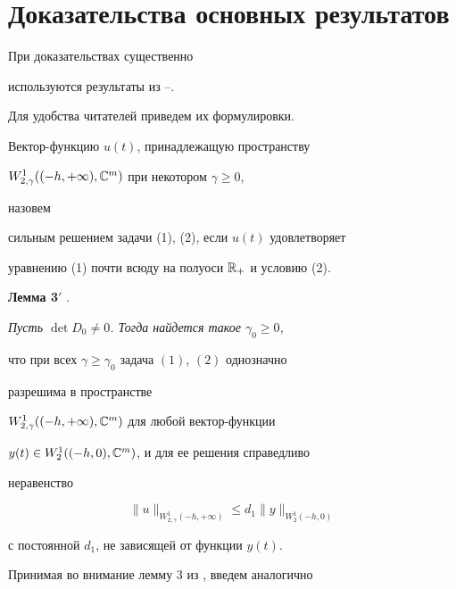  


\section{Доказательства основных результатов} 


 


При доказательствах существенно 


используются результаты из \cite{11}--\cite{16}.


Для удобства читателей приведем их формулировки.


 


\begin{defn} 


Вектор-функцию $u(t)$, принадлежащую пространству 


$W^1_{2,\gamma}((-h,+\infty),\Bbb C^m)$ при некотором $\gamma\ge0$, 


назовем 


сильным решением задачи (1), (2), если $u(t)$ удовлетворяет 


уравнению (1) почти всюду на полуоси $\Bbb R_+$ и условию (2). 


\end{defn} 





{\bf Лемма 3$'$} \cite{11}. {\it Пусть $\det 


D_0\ne0$. Тогда найдется такое $\gamma_0\ge0$, 


что при всех $\gamma\ge\gamma_0$ задача $(1)$, $(2)$ однозначно 


разрешима в пространстве 


$W^1_{2,\gamma}((-h,+\infty),\Bbb C^m)$ для любой вектор-функции 


$y(t)\in W^1_2((-h,0),\Bbb C^m)$, и для ее решения справедливо 


неравенство 


$$ 


\|u\|_{W^1_{2,\gamma}(-h,+\infty)}\le d_1 


\|y\|_{W^1_2(-h,0)} 


$$ 


с постоянной $d_1$, не зависящей от функции $y(t)$. 


}


\medskip


 


Принимая во внимание лемму 3 из \cite{5}, введем аналогично \cite{3} 


